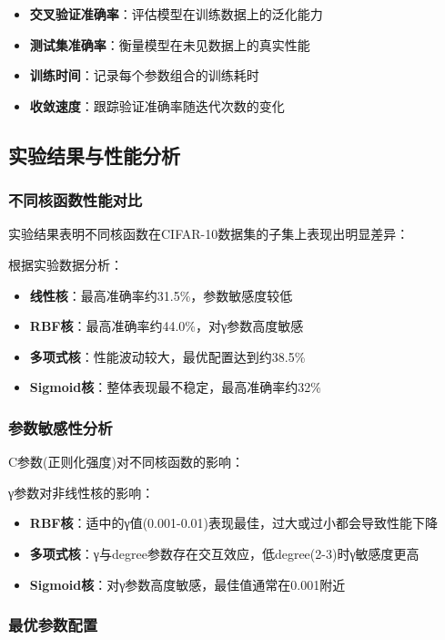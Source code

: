 \documentclass[UTF8]{report}
\theoremstyle{MyLineTheoremStyle} %
\theoremstyle{MyBlockTheoremStyle} %
\theoremstyle{MySubsubsectionStyle} %
\begin{document}
\begin{itemize}
    \item \textbf{交叉验证准确率}：评估模型在训练数据上的泛化能力
    \item \textbf{测试集准确率}：衡量模型在未见数据上的真实性能
    \item \textbf{训练时间}：记录每个参数组合的训练耗时
    \item \textbf{收敛速度}：跟踪验证准确率随迭代次数的变化
\end{itemize}

\subsection{实验结果与性能分析}

\subsubsection{不同核函数性能对比}

实验结果表明不同核函数在CIFAR-10数据集的子集上表现出明显差异：

根据实验数据分析：
\begin{itemize}
    \item \textbf{线性核}：最高准确率约31.5\%，参数敏感度较低
    \item \textbf{RBF核}：最高准确率约44.0\%，对γ参数高度敏感
    \item \textbf{多项式核}：性能波动较大，最优配置达到约38.5\%
    \item \textbf{Sigmoid核}：整体表现最不稳定，最高准确率约32\%
\end{itemize}

\subsubsection{参数敏感性分析}

C参数(正则化强度)对不同核函数的影响：

γ参数对非线性核的影响：
\begin{itemize}
    \item \textbf{RBF核}：适中的γ值(0.001-0.01)表现最佳，过大或过小都会导致性能下降
    \item \textbf{多项式核}：γ与degree参数存在交互效应，低degree(2-3)时γ敏感度更高
    \item \textbf{Sigmoid核}：对γ参数高度敏感，最佳值通常在0.001附近
\end{itemize}

\subsubsection{最优参数配置}
\end{document}
